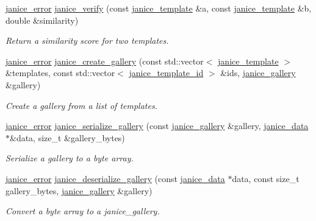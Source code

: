 \begin{DoxyCompactItemize}
\hyperlink{group__janice_ga4873d49c1f9d6a6880dfbd485cf6ba72}{janice\+\_\+error} \hyperlink{group__janice_gaee2b54d08a42051eb1d3e29fa5f87758}{janice\+\_\+verify} (const \hyperlink{group__janice_ga5593b06e86b90504968c0fc191ee2f3c}{janice\+\_\+template} \&a, const \hyperlink{group__janice_ga5593b06e86b90504968c0fc191ee2f3c}{janice\+\_\+template} \&b, double \&similarity)
\begin{DoxyCompactList}\small\item\em Return a similarity score for two templates. \end{DoxyCompactList}\item 
\hyperlink{group__janice_ga4873d49c1f9d6a6880dfbd485cf6ba72}{janice\+\_\+error} \hyperlink{group__janice_ga7a6e3e319b076e925e4d1ef7f51ae3a0}{janice\+\_\+create\+\_\+gallery} (const std\+::vector$<$ \hyperlink{group__janice_ga5593b06e86b90504968c0fc191ee2f3c}{janice\+\_\+template} $>$ \&templates, const std\+::vector$<$ \hyperlink{group__janice_ga5ec62465fbbc7a92faadfefd3d20e25b}{janice\+\_\+template\+\_\+id} $>$ \&ids, \hyperlink{group__janice_ga08feff1c2835b44332afeda80c3d0fb7}{janice\+\_\+gallery} \&gallery)
\begin{DoxyCompactList}\small\item\em Create a gallery from a list of templates. \end{DoxyCompactList}\item 
\hyperlink{group__janice_ga4873d49c1f9d6a6880dfbd485cf6ba72}{janice\+\_\+error} \hyperlink{group__janice_gaf73281961dce55d627dd73491a52509b}{janice\+\_\+serialize\+\_\+gallery} (const \hyperlink{group__janice_ga08feff1c2835b44332afeda80c3d0fb7}{janice\+\_\+gallery} \&gallery, \hyperlink{group__janice_ga63103e7e1c9df7d7403640223f3f6f07}{janice\+\_\+data} $\ast$\&data, size\+\_\+t \&gallery\+\_\+bytes)
\begin{DoxyCompactList}\small\item\em Serialize a gallery to a byte array. \end{DoxyCompactList}\item 
\hyperlink{group__janice_ga4873d49c1f9d6a6880dfbd485cf6ba72}{janice\+\_\+error} \hyperlink{group__janice_ga058a66cb15ea1d7af8fbe5f78dd5cc8c}{janice\+\_\+deserialize\+\_\+gallery} (const \hyperlink{group__janice_ga63103e7e1c9df7d7403640223f3f6f07}{janice\+\_\+data} $\ast$data, const size\+\_\+t gallery\+\_\+bytes, \hyperlink{group__janice_ga08feff1c2835b44332afeda80c3d0fb7}{janice\+\_\+gallery} \&gallery)
\begin{DoxyCompactList}\small\item\em Convert a byte array to a janice\+\_\+gallery. \end{DoxyCompactList}\item 

\end{DoxyCompactItemize}
